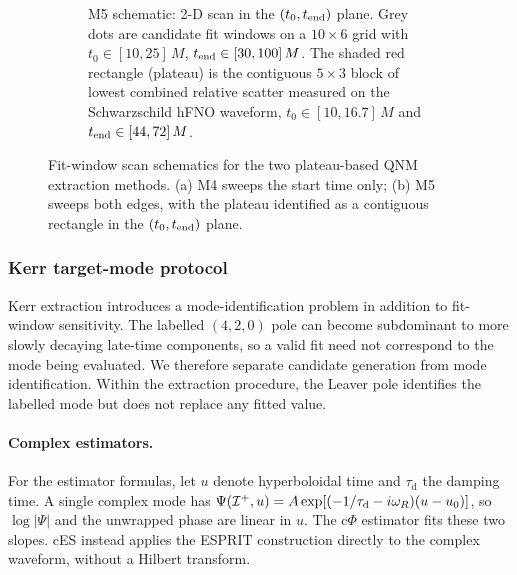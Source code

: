 \begin{figure}[t]
\begin{subfigure}[t]{\textwidth}
\caption{M5 schematic: 2-D scan in the $(t_0,t_{\mathrm{end}})$ plane. Grey
dots are candidate fit windows on a $10\times 6$ grid with
$t_0\in[10,25]\,M$, $t_{\mathrm{end}}\in[30,100]\,M$. The shaded red rectangle
(plateau) is the contiguous $5\times 3$ block of lowest combined
relative scatter measured on the Schwarzschild hFNO waveform,
$t_0\in[10,16.7]\,M$ and $t_{\mathrm{end}}\in[44,72]\,M$.}
\label{fig:m5}
\end{subfigure}
\caption{Fit-window scan schematics for the two plateau-based QNM
extraction methods. (a) M4 sweeps the start time only; (b) M5
sweeps both edges, with the plateau identified as a contiguous
rectangle in the $(t_0,t_{\mathrm{end}})$ plane.}
\label{fig:windows}
\end{figure}

\FloatBarrier

\subsubsection{Kerr target-mode protocol}
\label{sec:kerr-qnm}

Kerr extraction introduces a mode-identification problem in addition
to fit-window sensitivity. The labelled $(4,2,0)$ pole can become
subdominant to more slowly decaying late-time components, so a valid
fit need not correspond to the mode being evaluated. We therefore
separate candidate generation from mode identification. Within the
extraction procedure, the Leaver pole identifies the labelled mode but
does not replace any fitted value.

\paragraph{Complex estimators.} For the estimator formulas, let $u$
denote hyperboloidal time and $\tau_{\mathrm d}$ the damping time. A
single complex mode has
$\Psi(\mathcal{I}^{+},u)=A\exp[(-1/\tau_{\mathrm d}-i\omega_R)(u-u_0)]$,
so $\log|\Psi|$ and the unwrapped phase are linear in $u$. The
c$\Phi$ estimator fits these two slopes. cES instead applies the
ESPRIT construction directly to the complex waveform, without a
Hilbert transform.

